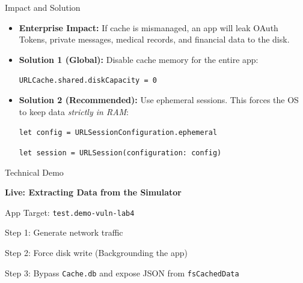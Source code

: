 \documentclass{beamer}
\begin{document}
\begin{frame}{Impact and Solution}
  \begin{itemize}
    \item \textbf{Enterprise Impact:} If cache is mismanaged, an app will leak OAuth Tokens, private messages, medical records, and financial data to the disk.
    \item \textbf{Solution 1 (Global):} Disable cache memory for the entire app:
    \par\smallskip
    \texttt{URLCache.shared.diskCapacity = 0}
    \item \textbf{Solution 2 (Recommended):} Use ephemeral sessions. This forces the OS to keep data \textit{strictly in RAM}:
    \par\smallskip
    \texttt{let config = URLSessionConfiguration.ephemeral}
    \par
    \texttt{let session = URLSession(configuration: config)}
  \end{itemize}
\end{frame}

\begin{frame}{Technical Demo}
  \begin{center}
    \Large \textbf{Live: Extracting Data from the Simulator}\par
    \vspace{2em}
    \normalsize App Target: \texttt{test.demo-vuln-lab4}\par
    \vspace{1em}
    Step 1: Generate network traffic\par
    Step 2: Force disk write (Backgrounding the app)\par
    Step 3: Bypass \texttt{Cache.db} and expose JSON from \texttt{fsCachedData}
  \end{center}
\end{frame}
\end{document}
